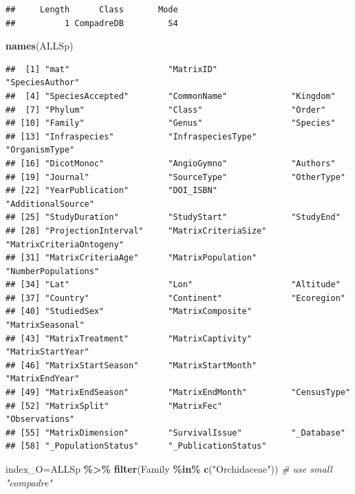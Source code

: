 \documentclass[
]{book}
\newenvironment{Shaded}{\begin{snugshade}}{\end{snugshade}}
\newcommand{\CommentTok}[1]{\textcolor[rgb]{0.56,0.35,0.01}{\textit{#1}}}
\newcommand{\FunctionTok}[1]{\textcolor[rgb]{0.13,0.29,0.53}{\textbf{#1}}}
\newcommand{\NormalTok}[1]{#1}
\newcommand{\OtherTok}[1]{\textcolor[rgb]{0.56,0.35,0.01}{#1}}
\newcommand{\SpecialCharTok}[1]{\textcolor[rgb]{0.81,0.36,0.00}{\textbf{#1}}}
\newcommand{\StringTok}[1]{\textcolor[rgb]{0.31,0.60,0.02}{#1}}
\theoremstyle{definition}
\theoremstyle{definition}
\theoremstyle{definition}
\theoremstyle{definition}
\theoremstyle{remark}
\begin{document}
\begin{verbatim}
##     Length      Class       Mode 
##          1 CompadreDB         S4
\end{verbatim}

\begin{Shaded}
\begin{Highlighting}[]
\FunctionTok{names}\NormalTok{(ALLSp)}
\end{Highlighting}
\end{Shaded}

\begin{verbatim}
##  [1] "mat"                    "MatrixID"               "SpeciesAuthor"         
##  [4] "SpeciesAccepted"        "CommonName"             "Kingdom"               
##  [7] "Phylum"                 "Class"                  "Order"                 
## [10] "Family"                 "Genus"                  "Species"               
## [13] "Infraspecies"           "InfraspeciesType"       "OrganismType"          
## [16] "DicotMonoc"             "AngioGymno"             "Authors"               
## [19] "Journal"                "SourceType"             "OtherType"             
## [22] "YearPublication"        "DOI_ISBN"               "AdditionalSource"      
## [25] "StudyDuration"          "StudyStart"             "StudyEnd"              
## [28] "ProjectionInterval"     "MatrixCriteriaSize"     "MatrixCriteriaOntogeny"
## [31] "MatrixCriteriaAge"      "MatrixPopulation"       "NumberPopulations"     
## [34] "Lat"                    "Lon"                    "Altitude"              
## [37] "Country"                "Continent"              "Ecoregion"             
## [40] "StudiedSex"             "MatrixComposite"        "MatrixSeasonal"        
## [43] "MatrixTreatment"        "MatrixCaptivity"        "MatrixStartYear"       
## [46] "MatrixStartSeason"      "MatrixStartMonth"       "MatrixEndYear"         
## [49] "MatrixEndSeason"        "MatrixEndMonth"         "CensusType"            
## [52] "MatrixSplit"            "MatrixFec"              "Observations"          
## [55] "MatrixDimension"        "SurvivalIssue"          "_Database"             
## [58] "_PopulationStatus"      "_PublicationStatus"
\end{verbatim}

\begin{Shaded}
\begin{Highlighting}[]
\NormalTok{index\_O}\OtherTok{=}\NormalTok{ALLSp }\SpecialCharTok{\%\textgreater{}\%} 
 \FunctionTok{filter}\NormalTok{(Family }\SpecialCharTok{\%in\%} \FunctionTok{c}\NormalTok{(}\StringTok{"Orchidaceae"}\NormalTok{)) }\CommentTok{\# use small "compadre"}
\end{Highlighting}
\end{Shaded}
\end{document}
